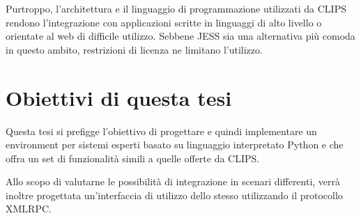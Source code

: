 Purtroppo, l'architettura e il linguaggio di programmazione utilizzati da CLIPS rendono l'integrazione con applicazioni scritte in linguaggi di alto livello o orientate al web di difficile utilizzo. Sebbene JESS sia una alternativa più comoda in questo ambito, restrizioni di licenza ne limitano l'utilizzo.

\section{Obiettivi di questa tesi}
Questa tesi si prefigge l'obiettivo di progettare e quindi implementare un environment per sistemi esperti basato su linguaggio interpretato Python e che offra un set di funzionalità simili a quelle offerte da CLIPS.

Allo scopo di valutarne le possibilità di integrazione in scenari differenti, verrà inoltre progettata un'interfaccia di utilizzo dello stesso utilizzando il protocollo XMLRPC.

